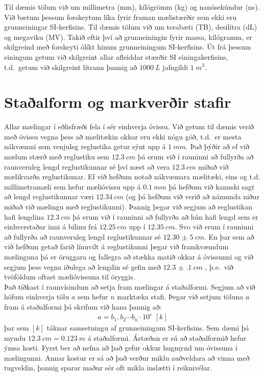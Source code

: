 Til dæmis tölum við um millimetra (mm), kílógrömm (kg) og nanósekúndur (ns). Við bætum þessum forskeytum líka fyrir framan mælistærðir sem ekki eru grunneiningar SI-kerfisins. Til dæmis tölum við um terabæti (TB), desilítra (dL) og megaviku (MV). Takið eftir því að grunneiningin fyrir massa, kílógramm, er skilgreind með forskeyti ólíkt hinum grunneiningum SI-kerfisins. Út frá þessum einingum getum við skilgreint allar afleiddar stærðir SI einingakerfisins, t.d.~getum við skilgreint lítrann þannig að $\SI{1000}{L}$ jafngildi $\SI{1}{m^3}$.

\section{Staðalform og markverðir stafir}

Allar mælingar í eðlisfræði fela í sér einhverja óvissu. Við getum til dæmis verið með óvissu vegna þess að mælitækin okkar eru ekki nógu góð, t.d.~er mesta nákvæmni sem venjuleg reglustika getur sýnt upp á $\SI{1}{mm}$.
Það þýðir að ef við mælum stærð með reglustiku sem $\SI{12.3}{cm}$ þá erum við í rauninni að fullyrða að raunveruleg lengd reglustikunnar sé því næst að vera $\SI{12,3}{cm}$ miðað við mælikvarða reglustikunar.
Ef við hefðum notað nákvæmara mælitæki, eins og t.d. millimetramæli sem hefur mælióvissu upp á $\SI{0.1}{mm}$ þá hefðum við kannski sagt að lengd reglustikunnar væri $\SI{12,34}{cm}$ (og þá hefðum við verið að námunda niður miðað við mælingu með reglustikunni). Þannig þegar við segjum að reglustikan hafi lengdina $\SI{12,3}{cm}$ þá erum við í rauninni að fullyrða að hún hafi lengd sem er einhverstaðar inni 
á bilinu frá $\SI{12.25}{cm}$ upp í $\SI{12.35}{cm}$. Svo við erum í rauninni að fullyrða að raunveruleg lengd reglustikunnar sé $\SI{12,30(5)}{cm}$. En þar sem að við hefðum getað farið línuvilt á reglustikunni þegar við framkvæmdum mælinguna þá er öruggara og fallegra að stækka matið okkar á óvissunni og við segjum þess vegna iðulega að lengdin sé gefin með $\SI{12.3(1)}{cm}$ , þ.e.~við tvöföldum oftast mælióvissuna til öryggis. \\

Það tíðkast í raunvísindum að setja fram mælingar á staðalformi. Segjum að við höfum einhverja tölu $a$ sem hefur $n$ marktæka stafi. Þegar við setjum töluna $a$ fram á staðalformi þá skrifum við hana þannig að:
\begin{align*}
    a = b_1, b_2 \cdots b_n \cdot 10^{c} \, \, [k]
\end{align*}
þar sem $[k]$ táknar samsetningu af grunneiningum SI-kerfisins. Sem dæmi þá myndu $\SI{12,3}{cm} = \SI{0,123}{m}$ á staðalformi. Ástæðan er sú að staðalformið hefur ýmsa kosti. Fyrst ber að nefna að það gefur okkur hugmynd um óvissuna í mælingunni. Annar kostur er sá að það verður miklu auðveldara að vinna með tugveldin, þannig sparar maður sér oft mikla inslætti í reiknivélar.

